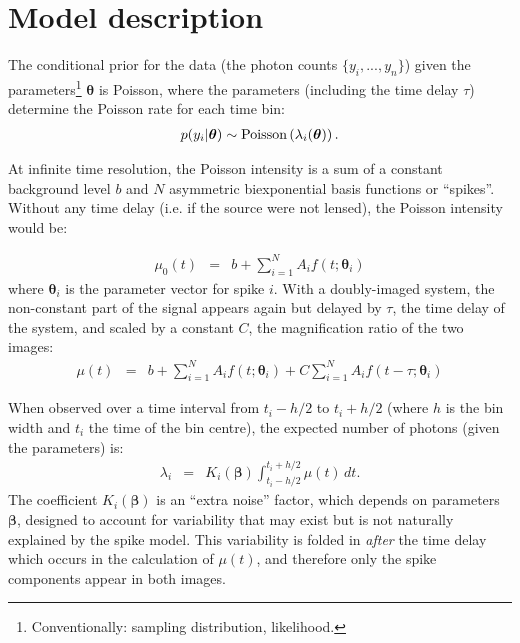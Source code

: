 \documentclass[a4paper, 11pt]{article}
\title{}
\author{}
\date{\today}
\begin{document}
\maketitle


\section{Model description}

The conditional prior for the data (the photon counts $\{y_i, ..., y_n\}$)
given the parameters\footnote{Conventionally:
sampling distribution, likelihood.} $\boldsymbol{\theta}$ is Poisson,
where the parameters (including the time delay $\tau$)
determine the Poisson rate for each time bin:
\begin{eqnarray}
p(y_i | \boldsymbol{\theta}) \sim \textnormal{Poisson}
\left(
\lambda_i(\boldsymbol{\theta})
\right).
\end{eqnarray}



At infinite time resolution, the Poisson intensity is a sum of a constant
background level $b$ and $N$ asymmetric biexponential basis functions or
``spikes''. Without any time delay (i.e. if the source were not lensed),
the Poisson intensity would be:

\begin{eqnarray}
\mu_0(t) &=& b + \sum_{i=1}^N A_i f(t; \boldsymbol{\theta}_i)
\end{eqnarray}
where $\boldsymbol{\theta}_i$ is the parameter vector for spike $i$.
With a doubly-imaged system, the non-constant part of the signal appears
again but delayed by $\tau$, the time delay of the system, and scaled by
a constant $C$, the magnification ratio of the two images:
\begin{eqnarray}
\mu(t) &=& b + \sum_{i=1}^N A_i f(t; \boldsymbol{\theta}_i) +
C\sum_{i=1}^N A_i f(t - \tau; \boldsymbol{\theta}_i)
\end{eqnarray}

When observed over a time interval from $t_i - h/2$ to $t_i + h/2$ (where
$h$ is the bin width and $t_i$ the time of the bin centre), the expected
number of photons (given the parameters) is:
\begin{eqnarray}
\lambda_i &=& K_i(\boldsymbol{\beta})\int_{t_i - h/2}^{t_i + h/2} \mu(t) \, dt.
\end{eqnarray}
The coefficient $K_i(\boldsymbol{\beta})$ is an ``extra noise'' factor, which
depends on parameters $\boldsymbol{\beta}$, designed to account for variability
that may exist but is not naturally explained by the spike model. This
variability is folded in {\it after} the time delay which occurs in the
calculation of $\mu(t)$, and therefore only the spike components appear in
both images.
\end{document}
